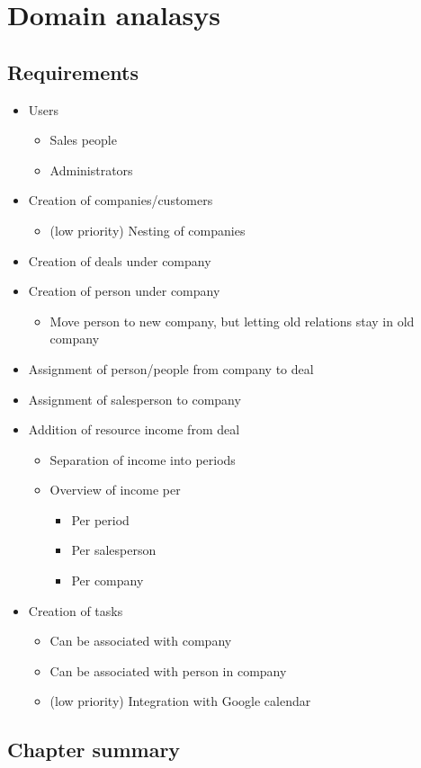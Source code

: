 \chapter{Domain analasys}
\label{chap:Domain analasys}

\section{Requirements}
\label{sec:Requirements}

\begin{itemize}
  \item Users
  \begin{itemize}
    \item Sales people
    \item Administrators
  \end{itemize}
  \item Creation of companies/customers
  \begin{itemize}
    \item (low priority) Nesting of companies
  \end{itemize}
  \item Creation of deals under company
  \item Creation of person under company
  \begin{itemize}
    \item Move person to new company, but letting old relations stay in old company
  \end{itemize}
  \item Assignment of person/people from company to deal
  \item Assignment of salesperson to company
  \item Addition of resource income from deal
  \begin{itemize}
    \item Separation of income into periods
    \item Overview of income per
    \begin{itemize}
      \item Per period
      \item Per salesperson
      \item Per company
    \end{itemize}
  \end{itemize}
  \item Creation of tasks
  \begin{itemize}
    \item Can be associated with company
    \item Can be associated with person in company
    \item (low priority) Integration with Google calendar
  \end{itemize}
\end{itemize}


\section{Chapter summary}
\label{sec:Chapter summary}

